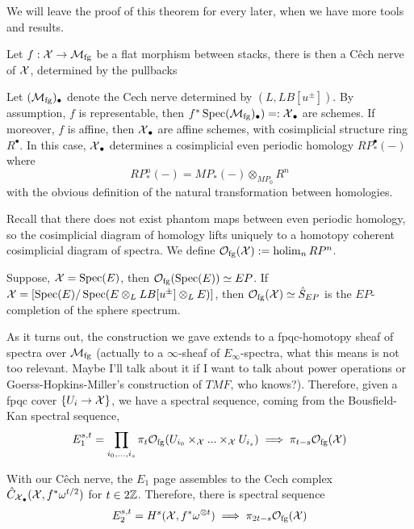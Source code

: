 We will leave the proof of this theorem for every later, when we have more tools and results.

\begin{remark}
    Let $f:\operatorname{\mathcal{X}} \to \mathcal{M}_{\mathrm{fg}}$ be a flat morphism between stacks, there is then a Cêch nerve of $\operatorname{\mathcal{X}}$, determined by the pullbacks
    \begin{center}
    \end{center}

    Let $(\mathcal{M}_{\mathrm{fg}})_{\bullet}$ denote the Cech nerve determined by $(L,LB[u^{\pm}])$. By assumption, $f$ is representable, then $f^*\operatorname{\mathrm{Spec}}(\mathcal{M}_{\mathrm{fg}})_{\bullet})=:\operatorname{\mathcal{X}}_{\bullet}$ are schemes. 
    If moreover, $f$ is affine, then $\operatorname{\mathcal{X}}_{\bullet}$ are affine schemes, with cosimplicial structure ring $R^{\bullet}$. In this case, $\operatorname{\mathcal{X}}_\bullet$ determines a cosimplicial 
    even periodic homology $RP^{\bullet}_*(-)$ where
    \[
   RP^{n}_*(-)=MP_*(-)\otimes_{MP_0}R^n
    \]with the obvious definition of the natural transformation between homologies.

    Recall that there does not exist phantom maps between even periodic homology, so the cosimplicial diagram of homology lifts uniquely 
    to a homotopy coherent cosimplicial diagram of spectra. We define $\mathcal{O}_{\operatorname{\mathrm{fg}}}(\operatorname{\mathcal{X}}):=\operatorname{holim}_n RP^{n}$. 

    Suppose, $\operatorname{\mathcal{X}}=\operatorname{\mathrm{Spec}}(E)$, then $\mathcal{O}_{\operatorname{\mathrm{fg}}}(\operatorname{\mathrm{Spec}}(E))\simeq EP$. If $\operatorname{\mathcal{X}}=[\operatorname{\mathrm{Spec}}(E)/\operatorname{\mathrm{Spec}}(E\otimes_L LB[u^{\pm}]\otimes_L E)]$, then 
    $\mathcal{O}_{\operatorname{\mathrm{fg}}}(\operatorname{\mathcal{X}})\simeq \hat{S}_{EP}$ is the $EP$-completion of the sphere spectrum.

    As it turns out, the construction we gave extends to a fpqc-homotopy sheaf of spectra over $\mathcal{M}_{\mathrm{fg}}$ (actually to a $\infty$-sheaf of $E_\infty$-spectra,
     what this means is not too relevant. Maybe I'll talk about it if I want to talk about power operations or Goerss-Hopkins-Miller's construction of $TMF$, 
     who knows?). Therefore, given a fpqc cover $\{U_i\to \operatorname{\mathcal{X}}\}$, we have a spectral sequence, coming from the Bousfield-Kan spectral sequence,
     \[
        E_{1}^{s,t}=\prod_{i_0,...,i_s}\pi_t\mathcal{O}_{\operatorname{\mathrm{fg}}}(U_{i_0}\times_{\operatorname{\mathcal{X}}}... \times_{\operatorname{\mathcal{X}}}U_{i_s})\implies \pi_{t-s}\mathcal{O}_{\operatorname{\mathrm{fg}}}(\operatorname{\mathcal{X}})
     \]
    
    With our Cêch nerve, the $E_1$ page assembles to the Cech complex $\hat{C}_{\operatorname{\mathcal{X}}_{\bullet}}(\operatorname{\mathcal{X}}, f^*\omega^{t/2})$ for $t\in 2\mathbb{Z}$. Therefore, there is spectral 
    sequence
    \[
    E_{2}^{s,t}=H^{s}(\operatorname{\mathcal{X}}, f^*\omega^{\otimes t})\implies \pi_{2t-s}\mathcal{O}_{\operatorname{\mathrm{fg}}}(\operatorname{\mathcal{X}})
    \]
\end{remark}

